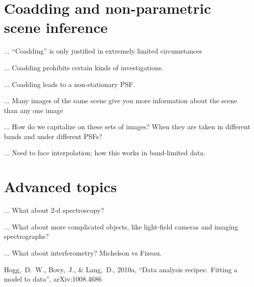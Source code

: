 \documentclass[12pt,twoside,pdftex]{article}
\begin{document}
\section{Coadding and non-parametric scene inference}

... ``Coadding'' is only justified in extremely limited circumstances

... Coadding prohibits certain kinds of investigations.

... Coadding leads to a non-stationary PSF.

... Many images of the same scene give you more information about the scene than any one image

... How do we capitalize on these sets of images?  When they are taken in different bands and under different PSFs?

... Need to face interpolation; how this works in band-limited data.

\section{Advanced topics}

... What about 2-d spectroscopy?

... What about more complicated objects, like light-field cameras and
imaging spectrographs?

... What about interferometry?  Michelson vs Fizeau.

\clearpage
{}\theendnotes

\clearpage
\begin{thebibliography}{}\raggedright
{}
  Hogg,~D.~W., Bovy,~J., \& Lang,~D., 2010a,
  ``Data analysis recipes:\ Fitting a model to data'', arXiv:1008.4686
\end{thebibliography}
\end{document}
